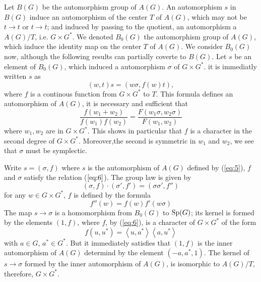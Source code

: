 \documentclass[12pt]{amsart}
\def\inn#1#2{\left\langle{#1},{#2}\right\rangle}
\def\Sp{{\rm Sp}}
\newcounter{ssection}
\renewcommand{\subsection}{
  \addtocounter{ssection}{1}{\bf  \arabic{ssection}.\  }}
\begin{document}
\subsection{}
Let $B(G)$ be the automorphism group of $A(G)$. 
An automorphism $s$ in  $B(G)$ induce an automorphism of the center $T$ of 
 $A(G)$, which may not be $t\to t$ or $t\to \overline{t}$; 
and induced by passing to the quotient, an automorphism a $A(G)/T$, i.e. 
$G\times G^*$. We denoted $B_0(G)$ the automorphism group of $A(G)$, 
which induce the identity map on the center $T$ of $A(G)$.
We  consider $B_0(G)$ now, although the following results can partially 
coverte to $B(G)$. Let $s$ be an element of $B_0(G)$, which induced a 
automorphism $\sigma$ of $G\times G^*$. it is immediatly written $s$ as
\begin{equation}\label{eq:5}
(w,t)s = (w\sigma, f(w)t),
\end{equation}
where $f$ is a continous function from $G\times G^*$ to $T$. 
This formula defines an automorphism of $A(G)$, it is necessary and sufficient 
that
\begin{equation}\label{eq:6}
\frac{f(w_1+w_2)}{f(w_1)f(w_2)}=\frac{F(w_1\sigma, w_2\sigma)}{F(w_1,w_2)}
\end{equation}
where $w_1,w_2$ are in $G\times G^*$.
This shows in particular that $f$ 
is a character in the second degree of $G\times G^*$. 
Moreover,the second is symmetric in $w_1$ and $w_2$,
 we see that $\sigma$ must be symplectic.

Write $s = (\sigma, f)$ where $s$ is the automorphism of $A(G)$ defined by 
(\ref{eq:5}), $f$ and $\sigma$ satisfy the relation ($\ref{eq:6}$).
The group law is given by 
\[
(\sigma, f)\cdot(\sigma',f') = (\sigma\sigma', f'')
\]
for any $w\in G\times G^*$, $f$ is defined by the formula
\begin{equation}\label{eq:7}
f''(w)=f(w)f'(w\sigma)
\end{equation}
The map $s\to \sigma$ is a homomorphism from $B_0(G)$ to $\Sp(G)$;
its kernel is formed by  the elements $(1,f)$, where $f$, by (\ref{eq:6}),
is a character of $G\times G^*$ of the form 
\[
f(u,u^*) = \inn{u}{a^*}\inn{a}{u^*}
\]
with $a\in G$, $a^*\in G^*$. 	 	
But it immediately satisfies that $(1,f)$ is the inner
 automorphism of $A(G)$ determind by the element $(-a, a^*, 1)$. 
The kernel of $s\to \sigma$ formed by the inner automorphism of $A(G)$,
is isomorphic to $A(G)/T$, therefore, $G\times G^*$.
\end{document}
